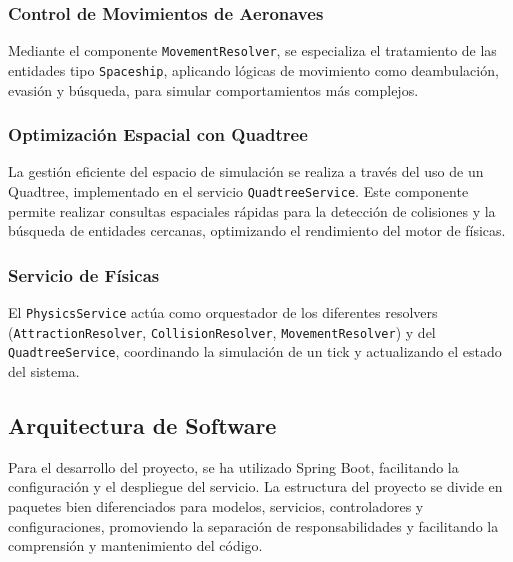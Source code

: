 \subsubsection{Control de Movimientos de Aeronaves}
Mediante el componente \texttt{MovementResolver}, se especializa el tratamiento de las entidades tipo \texttt{Spaceship}, aplicando lógicas de movimiento como deambulación, evasión y búsqueda, para simular comportamientos más complejos.

\subsubsection{Optimización Espacial con Quadtree}
La gestión eficiente del espacio de simulación se realiza a través del uso de un Quadtree, implementado en el servicio \texttt{QuadtreeService}. Este componente permite realizar consultas espaciales rápidas para la detección de colisiones y la búsqueda de entidades cercanas, optimizando el rendimiento del motor de físicas.

\subsubsection{Servicio de Físicas}
El \texttt{PhysicsService} actúa como orquestador de los diferentes resolvers (\texttt{AttractionResolver}, \texttt{CollisionResolver}, \texttt{MovementResolver}) y del \texttt{QuadtreeService}, coordinando la simulación de un tick y actualizando el estado del sistema.

\subsection{Arquitectura de Software}
Para el desarrollo del proyecto, se ha utilizado Spring Boot, facilitando la configuración y el despliegue del servicio. La estructura del proyecto se divide en paquetes bien diferenciados para modelos, servicios, controladores y configuraciones, promoviendo la separación de responsabilidades y facilitando la comprensión y mantenimiento del código.
